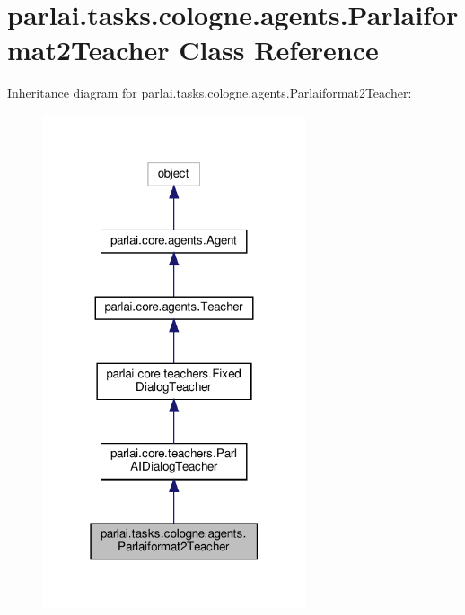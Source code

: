 \hypertarget{classparlai_1_1tasks_1_1cologne_1_1agents_1_1Parlaiformat2Teacher}{}\section{parlai.\+tasks.\+cologne.\+agents.\+Parlaiformat2\+Teacher Class Reference}
\label{classparlai_1_1tasks_1_1cologne_1_1agents_1_1Parlaiformat2Teacher}


Inheritance diagram for parlai.\+tasks.\+cologne.\+agents.\+Parlaiformat2\+Teacher\+:
\nopagebreak
\begin{figure}[H]
\begin{center}
\leavevmode
\includegraphics[width=219pt]{classparlai_1_1tasks_1_1cologne_1_1agents_1_1Parlaiformat2Teacher__inherit__graph}
\end{center}
\end{figure}


